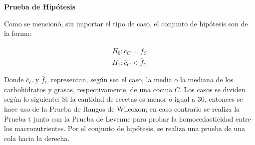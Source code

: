 \documentclass[12pt,a4paper]{article}
\begin{document}
        \textbf{Prueba de Hipótesis}\\
        {
            Como se mencionó, sin importar el tipo de caso, el conjunto de hipótesis 
            son de la forma:
            
            \begin{align*}
                H_0 : \overline{c}_C = \overline{f}_C \\
                H_1 : \overline{c}_C < \overline{f}_C
            \end{align*}

            Donde $\overline{c}_C$ y $\overline{f}_C$ representan, según sea el caso, 
            la media o la mediana de los carbohidratos y grasas, respectivamente, de 
            una cocina $C$. 
            Los casos se dividen según lo siguiente: Si la cantidad de recetas es menor 
            o igual a $30$, entonces se hace uso de la Prueba de Rangos de Wilcoxon; en 
            caso contrario se realiza la Prueba t junto con la Prueba de Levenne para 
            probar la homocedasticidad entre los macronutrientes. Por el conjunto de hipótesis, 
            se realiza una prueba de una cola hacia la derecha.\\
        }
\end{document}
